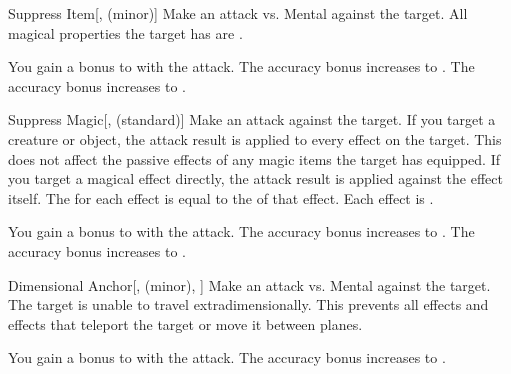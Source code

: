 \lowercase{\hypertarget{spell:Suppress Item}{}}\label{spell:Suppress Item}
\begin{freeability}[Rank 1]{\hypertarget{spell:Suppress Item}{Suppress Item}}[,  (minor)]
Make an attack vs. Mental against the target.
\hit All magical properties the target has are .

\rankline
{} You gain a  bonus to  with the attack.
 The accuracy bonus increases to .
 The accuracy bonus increases to .
\end{freeability}
\vspace{0.25em}



\lowercase{\hypertarget{spell:Suppress Magic}{}}\label{spell:Suppress Magic}
\begin{freeability}[Rank 1]{\hypertarget{spell:Suppress Magic}{Suppress Magic}}[,  (standard)]
Make an attack against the target.
If you target a creature or object, the attack result is applied to every  effect on the target.
This does not affect the passive effects of any magic items the target has equipped.
If you target a magical effect directly, the attack result is applied against the effect itself.
The  for each effect is equal to the  of that effect.
\hit Each effect is .

\rankline
{} You gain a  bonus to  with the attack.
 The accuracy bonus increases to .
 The accuracy bonus increases to .
\end{freeability}
\vspace{0.25em}



\lowercase{\hypertarget{spell:Dimensional Anchor}{}}\label{spell:Dimensional Anchor}
\begin{freeability}[Rank 3]{\hypertarget{spell:Dimensional Anchor}{Dimensional Anchor}}[,  (minor), ]
Make an attack vs. Mental against the target.
\hit The target is unable to travel extradimensionally.
This prevents all  effects and effects that teleport the target or move it between planes.

\rankline
{} You gain a  bonus to  with the attack.
 The accuracy bonus increases to .
\end{freeability}
\vspace{0.25em}



